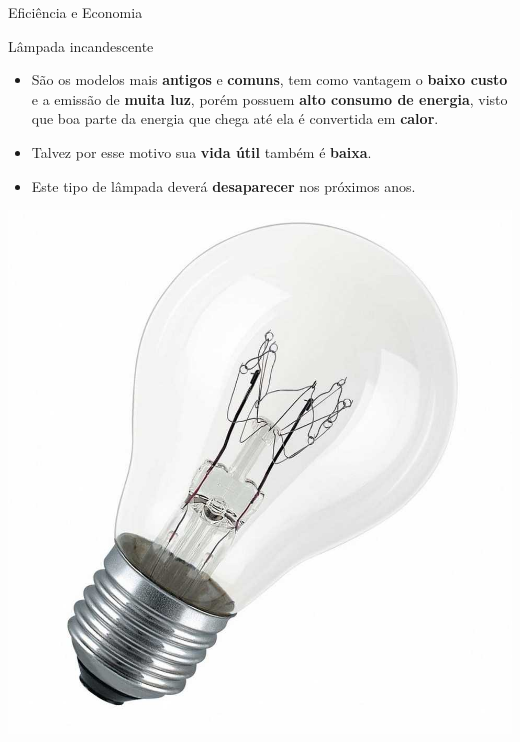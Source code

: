 \begin{frame}{Eficiência e Economia}
	\begin{block}{Lâmpada incandescente}
		\begin{itemize}
			\item São os modelos mais \textbf{antigos} e \textbf{comuns}, tem como vantagem o \textbf{baixo custo} e a emissão de \textbf{muita luz}, porém possuem \textbf{alto consumo de energia}, visto que boa parte da energia que chega até ela é convertida em \textbf{calor}.
			\item Talvez por esse motivo sua \textbf{vida útil} também é \textbf{baixa}.
			\item Este tipo de lâmpada deverá \textbf{desaparecer} nos próximos anos.
		\end{itemize}
	\end{block}


	\centering
	\includegraphics[height=0.45\textheight]{Figuras/Ch07/fig9}
\end{frame}


